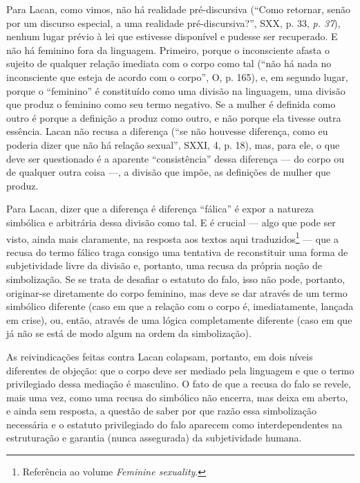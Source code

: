 Para Lacan, como vimos, não há realidade pré-discursiva (``Como
retornar, senão por um discurso especial, a uma realidade
pré-discursiva?'', SXX, p. 33, \emph{p. 37}), nenhum lugar prévio à lei
que estivesse disponível e pudesse ser recuperado. E não há feminino
fora da linguagem. Primeiro, porque o inconsciente afasta o sujeito de
qualquer relação imediata com o corpo como tal (``não há nada no
inconsciente que esteja de acordo com o corpo'', O, p. 165), e, em
segundo lugar, porque o ``feminino'' é constituído como uma divisão na
linguagem, uma divisão que produz o feminino como seu termo negativo. Se
a mulher é definida como outro é porque a definição a produz como outro,
e não porque ela tivesse outra essência. Lacan não recusa a diferença
(``se não houvesse diferença, como eu poderia dizer que não há relação
sexual'', SXXI, 4, p. 18), mas, para ele, o que deve ser questionado é a
aparente ``consistência'' dessa diferença --- do corpo ou de qualquer
outra coisa ---, a divisão que impõe, as definições de mulher que produz.

Para Lacan, dizer que a diferença é diferença ``fálica'' é expor a
natureza simbólica e arbitrária dessa divisão como tal. E é crucial ---
algo que pode ser visto, ainda mais claramente, na resposta aos textos
aqui traduzidos\footnote{Referência ao volume \emph{Feminine sexuality}.}
--- que a recusa do termo fálico traga consigo uma tentativa de
reconstituir uma forma de subjetividade livre da divisão e, portanto,
uma recusa da própria noção de simbolização. Se se trata de desafiar o
estatuto do falo, isso não pode, portanto, originar-se diretamente do
corpo feminino, mas deve se dar através de um termo simbólico diferente
(caso em que a relação com o corpo é, imediatamente, lançada em crise),
ou, então, através de uma lógica completamente diferente (caso em que já
não se está de modo algum na ordem da simbolização).

As reivindicações feitas contra Lacan colapsam, portanto, em dois níveis
diferentes de objeção: que o corpo deve ser mediado pela linguagem e que
o termo privilegiado dessa mediação é masculino. O fato de que a recusa
do falo se revele, mais uma vez, como uma recusa do simbólico não
encerra, mas deixa em aberto, e ainda sem resposta, a questão de saber
por que razão essa simbolização necessária e o estatuto privilegiado do
falo aparecem como interdependentes na estruturação e garantia (nunca
assegurada) da subjetividade humana.

